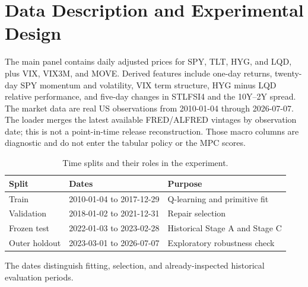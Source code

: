 \documentclass[11pt,a4paper]{article}
\begin{document}
\section{Data Description and Experimental Design}
The main panel contains daily adjusted prices for SPY, TLT, HYG, and LQD, plus VIX, VIX3M, and MOVE. Derived features include one-day returns, twenty-day SPY momentum and volatility, VIX term structure, HYG minus LQD relative performance, and five-day changes in STLFSI4 and the 10Y--2Y spread. The market data are real US observations from 2010-01-04 through 2026-07-07. The loader merges the latest available FRED/ALFRED vintages by observation date; this is not a point-in-time release reconstruction. Those macro columns are diagnostic and do not enter the tabular policy or the MPC scores.

\begin{table}[H]
\centering
\caption{Time splits and their roles in the experiment.}
\label{tab:splits}
\begin{tabular}{@{}lll@{}}
\toprule
Split & Dates & Purpose\\
\midrule
Train & 2010-01-04 to 2017-12-29 & Q-learning and primitive fit\\
Validation & 2018-01-02 to 2021-12-31 & Repair selection\\
Frozen test & 2022-01-03 to 2023-02-28 & Historical Stage A and Stage C\\
Outer holdout & 2023-03-01 to 2026-07-07 & Exploratory robustness check\\
\bottomrule
\end{tabular}
\end{table}
The dates distinguish fitting, selection, and already-inspected historical evaluation periods.
\end{document}
